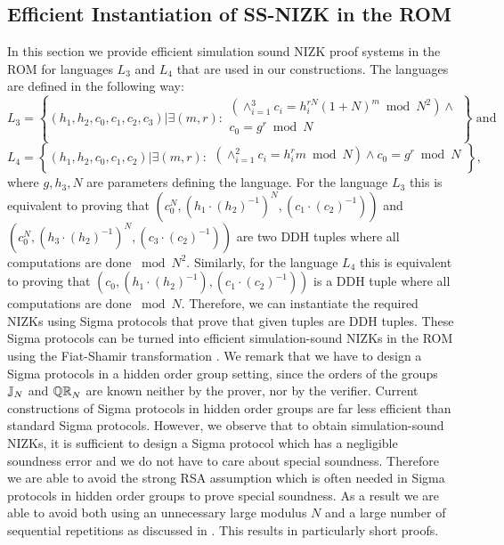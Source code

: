 \subsection{Efficient Instantiation of SS-NIZK in the ROM}\label{sec:nizk} 
In this section we provide efficient simulation sound NIZK proof systems in the ROM for languages $L_3$ and $L_4$ that are used in our constructions. The languages are defined in the following way:
\[
L_3 = \left\{(h_1, h_2, c_0, c_1, c_2, c_3)| \exists (m,r):
\begin{aligned}
       (\land_{i=1}^3 c_i = h_i^{rN}(1+N)^m \bmod N^2) \land \\
       c_0 = g^r \bmod N\\
    \end{aligned}
    \right\} \text{ and }
\]
\[
L_4 = \left\{(h_1, h_2, c_0, c_1, c_2)| \exists (m,r):
\begin{aligned}
       (\land_{i=1}^2 c_i = h_i^{r}m \bmod N) \land
       c_0 = g^r \bmod N\\
    \end{aligned}
    \right\}, 
\]
where $g, h_3, N$ are parameters defining the language. For the language $L_3$ this is equivalent to proving that $(c_0^N, (h_1\cdot (h_2)^{-1})^N , (c_1\cdot (c_2)^{-1}))$ and $(c_0^N, (h_3\cdot (h_2)^{-1})^N, (c_3\cdot (c_2)^{-1}))$ are two DDH tuples where all computations are done $\bmod N^2$. Similarly, for the language $L_4$ this is equivalent to proving that $(c_0, (h_1\cdot (h_2)^{-1}), (c_1\cdot (c_2)^{-1}))$ is a DDH tuple where all computations are done $\bmod N$. Therefore, we can instantiate the required NIZKs using Sigma protocols that prove that given tuples are DDH tuples. These Sigma protocols can be turned into efficient simulation-sound NIZKs in the ROM using the Fiat-Shamir transformation \cite{C:FiaSha86}. We remark that we have to design a Sigma protocols in a hidden order group setting, since the orders of the groups $\mathbb{J}_N$ and $\mathbb{QR}_N$ are known neither by the prover, nor by the verifier. Current constructions of Sigma protocols in hidden order groups are far less efficient than standard Sigma protocols. However, we observe that to obtain simulation-sound NIZKs, it is sufficient to design a Sigma protocol which has a negligible soundness error and we do not have to care about special soundness. Therefore we are able to avoid the strong RSA assumption which is often needed in Sigma protocols in hidden order groups to prove special soundness. As a result we are able to avoid both using an unnecessary large modulus $N$ and a large number of sequential repetitions as discussed in \cite{SPEED:BKSST}. 
This results in particularly short proofs. 

